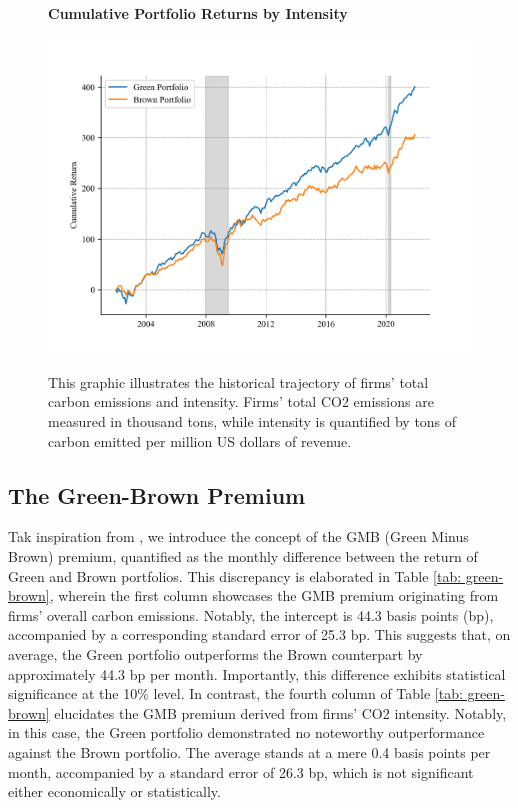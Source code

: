 \documentclass[12pt]{article}
\begin{document}
\begin{figure}[!ht]
\centering
\caption{\textbf{Cumulative Portfolio Returns by Intensity}}
\includegraphics{graphics/green_brown_int.png}
\label{fig: cum_ret_2}
\caption*{\footnotesize{This graphic illustrates the historical trajectory of firms' total carbon emissions and intensity. Firms' total CO2 emissions are measured in thousand tons, while intensity is quantified by tons of carbon emitted per million US dollars of revenue.}}
\end{figure}

\subsection{The Green-Brown Premium}

Tak inspiration from \cite{pastor2022dissecting}, we introduce the concept of the GMB (Green Minus Brown) premium, quantified as the monthly difference between the return of Green and Brown portfolios. This discrepancy is elaborated in Table \ref{tab: green-brown}, wherein the first column showcases the GMB premium originating from firms' overall carbon emissions. Notably, the intercept is 44.3 basis points (bp), accompanied by a corresponding standard error of 25.3 bp. This suggests that, on average, the Green portfolio outperforms the Brown counterpart by approximately 44.3 bp per month. Importantly, this difference exhibits statistical significance at the 10\% level. In contrast, the fourth column of Table \ref{tab: green-brown} elucidates the GMB premium derived from firms' CO2 intensity. Notably, in this case, the Green portfolio demonstrated no noteworthy outperformance against the Brown portfolio. The average stands at a mere 0.4 basis points per month, accompanied by a standard error of 26.3 bp, which is not significant either economically or statistically.
\end{document}
